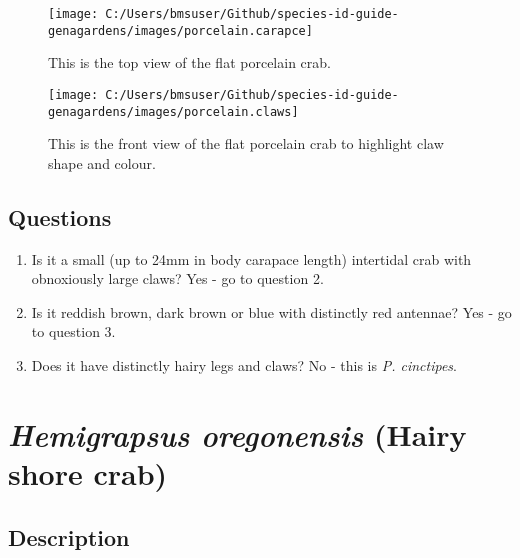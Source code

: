 \documentclass[
]{article}
\providecommand{\tightlist}{%
  \setlength{\itemsep}{0pt}\setlength{\parskip}{0pt}}
\begin{document}
\begin{figure}

\texttt{[image: C:/Users/bmsuser/Github/species-id-guide-genagardens/images/porcelain.carapce]} \hfill{}

\caption{This is the top view of the flat porcelain crab.}\label{fig:porcelain.carapace}
\end{figure}

\begin{figure}

\texttt{[image: C:/Users/bmsuser/Github/species-id-guide-genagardens/images/porcelain.claws]} \hfill{}

\caption{This is the front view of the flat porcelain crab to highlight claw shape and colour.}\label{fig:porcelain.claws}
\end{figure}
\newpage

\hypertarget{questions-2}{%
\subsection{Questions}\label{questions-2}}

\begin{enumerate}
\def\labelenumi{\arabic{enumi}.}
\tightlist
\item
  Is it a small (up to 24mm in body carapace length) intertidal crab
  with obnoxiously large claws? Yes - go to question 2.\\
\item
  Is it reddish brown, dark brown or blue with distinctly red antennae?
  Yes - go to question 3.\\
\item
  Does it have distinctly hairy legs and claws? No - this is \emph{P.
  cinctipes}.
\end{enumerate}

\newpage

\hypertarget{hemigrapsus-oregonensis-hairy-shore-crab}{%
\section{\texorpdfstring{\emph{Hemigrapsus oregonensis} (Hairy shore
crab)}{Hemigrapsus oregonensis (Hairy shore crab)}}\label{hemigrapsus-oregonensis-hairy-shore-crab}}

\hypertarget{description-3}{%
\subsection{Description}\label{description-3}}
\end{document}
